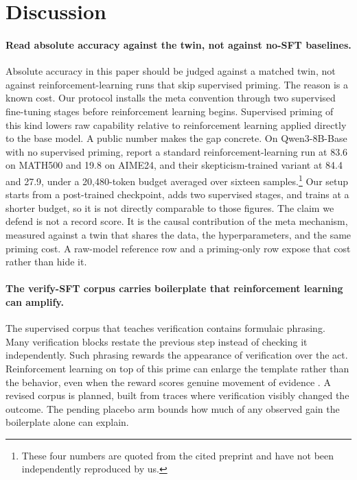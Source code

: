 \section{Discussion}
\label{sec:discussion}

\paragraph{Read absolute accuracy against the twin, not against no-SFT baselines.}
Absolute accuracy in this paper should be judged against a matched twin, not
against reinforcement-learning runs that skip supervised priming. The reason is
a known cost. Our protocol installs the meta convention through two supervised
fine-tuning stages before reinforcement learning begins. Supervised priming of
this kind lowers raw capability relative to reinforcement learning applied
directly to the base model. A public number makes the gap concrete. On
Qwen3-8B-Base with no supervised priming, \citet{kim2026rebellious} report a
standard reinforcement-learning run at 83.6 on MATH500 and 19.8 on AIME24, and
their skepticism-trained variant at 84.4 and 27.9, under a 20{,}480-token budget
averaged over sixteen samples.\footnote{These four numbers are quoted from the
cited preprint and have not been independently reproduced by us.} Our setup
starts from a post-trained checkpoint, adds two supervised stages, and trains at
a shorter budget, so it is not directly comparable to those figures. The claim
we defend is not a record score. It is the causal contribution of the meta
mechanism, measured against a twin that shares the data, the hyperparameters,
and the same priming cost. A raw-model reference row and a priming-only row
expose that cost rather than hide it.

\paragraph{The verify-SFT corpus carries boilerplate that reinforcement learning can amplify.}
The supervised corpus that teaches verification contains formulaic phrasing.
Many verification blocks restate the previous step instead of checking it
independently. Such phrasing rewards the appearance of verification over the
act. Reinforcement learning on top of this prime can enlarge the template rather
than the behavior, even when the reward scores genuine movement of evidence
\citep{gandhi2025cognitive}. A revised corpus is planned, built from traces
where verification visibly changed the outcome. The pending placebo arm bounds
how much of any observed gain the boilerplate alone can explain.

